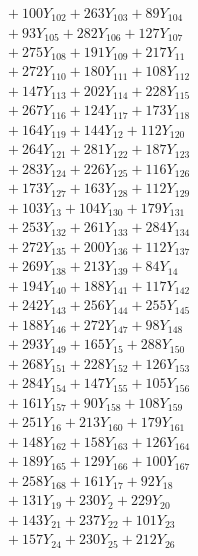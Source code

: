 \documentclass[a4paper,10pt]{article}
\begin{document}
{\begin{align}
&\quad  + 100Y_{102} + 263Y_{103} + 89Y_{104} \\[0.5ex]
&\quad  + 93Y_{105} + 282Y_{106} + 127Y_{107} \\[0.5ex]
&\quad  + 275Y_{108} + 191Y_{109} + 217Y_{11} \\[0.5ex]
&\quad  + 272Y_{110} + 180Y_{111} + 108Y_{112} \\[0.5ex]
&\quad  + 147Y_{113} + 202Y_{114} + 228Y_{115} \\[0.5ex]
&\quad  + 267Y_{116} + 124Y_{117} + 173Y_{118} \\[0.5ex]
&\quad  + 164Y_{119} + 144Y_{12} + 112Y_{120} \\[0.5ex]
&\quad  + 264Y_{121} + 281Y_{122} + 187Y_{123} \\[0.5ex]
&\quad  + 283Y_{124} + 226Y_{125} + 116Y_{126} \\[0.5ex]
&\quad  + 173Y_{127} + 163Y_{128} + 112Y_{129} \\[0.5ex]
&\quad  + 103Y_{13} + 104Y_{130} + 179Y_{131} \\[0.5ex]
&\quad  + 253Y_{132} + 261Y_{133} + 284Y_{134} \\[0.5ex]
&\quad  + 272Y_{135} + 200Y_{136} + 112Y_{137} \\[0.5ex]
&\quad  + 269Y_{138} + 213Y_{139} + 84Y_{14} \\[0.5ex]
&\quad  + 194Y_{140} + 188Y_{141} + 117Y_{142} \\[0.5ex]
&\quad  + 242Y_{143} + 256Y_{144} + 255Y_{145} \\[0.5ex]
&\quad  + 188Y_{146} + 272Y_{147} + 98Y_{148} \\[0.5ex]
&\quad  + 293Y_{149} + 165Y_{15} + 288Y_{150} \\[0.5ex]
&\quad  + 268Y_{151} + 228Y_{152} + 126Y_{153} \\[0.5ex]
&\quad  + 284Y_{154} + 147Y_{155} + 105Y_{156} \\[0.5ex]
&\quad  + 161Y_{157} + 90Y_{158} + 108Y_{159} \\[0.5ex]
&\quad  + 251Y_{16} + 213Y_{160} + 179Y_{161} \\[0.5ex]
&\quad  + 148Y_{162} + 158Y_{163} + 126Y_{164} \\[0.5ex]
&\quad  + 189Y_{165} + 129Y_{166} + 100Y_{167} \\[0.5ex]
&\quad  + 258Y_{168} + 161Y_{17} + 92Y_{18} \\[0.5ex]
&\quad  + 131Y_{19} + 230Y_{2} + 229Y_{20} \\[0.5ex]
&\quad  + 143Y_{21} + 237Y_{22} + 101Y_{23} \\[0.5ex]
&\quad  + 157Y_{24} + 230Y_{25} + 212Y_{26} \\[0.5ex]

\end{align}}
\end{document}
